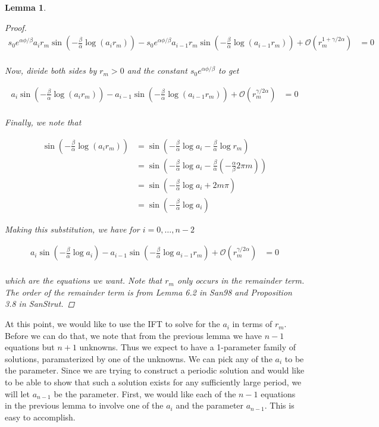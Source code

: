 \documentclass[12pt]{article}
\newtheorem{lemma}{Lemma}
\begin{document}
\begin{lemma}
\begin{proof}
\begin{align}\label{diff2}
s_0 e^{\alpha \phi / \beta } a_i r_m \sin \left( - \frac{\beta}{\alpha} \log (a_i r_m) \right) - s_0 e^{\alpha \phi / \beta } a_{i-1} r_m \sin \left( - \frac{\beta}{\alpha} \log (a_{i-1} r_m) \right) + \mathcal{O}(r_m^{1 + \gamma / 2 \alpha}) &= 0 \\
\end{align}

Now, divide both sides by $r_m > 0$ and the constant $s_0 e^{\alpha \phi / \beta }$ to get

\begin{align}\label{diff2}
a_i \sin \left( - \frac{\beta}{\alpha} \log (a_i r_m) \right) -  a_{i-1} \sin \left( - \frac{\beta}{\alpha} \log (a_{i-1} r_m) \right) + \mathcal{O}(r_m^{\gamma / 2 \alpha}) &= 0 \\
\end{align}

Finally, we note that

\begin{align*}
\sin \left( - \frac{\beta}{\alpha} \log (a_i r_m) \right)&=
\sin \left( - \frac{\beta}{\alpha} \log a_i - \frac{\beta}{\alpha} \log r_m  \right) \\
&= \sin \left( - \frac{\beta}{\alpha} \log a_i -\frac{\beta}{\alpha}\left( -\frac{\alpha}{\beta}2\pi m \right) \right) \\
&= \sin \left( - \frac{\beta}{\alpha} \log a_i + 2 m \pi \right) \\
&= \sin \left( - \frac{\beta}{\alpha} \log a_i \right) 
\end{align*}

Making this substitution, we have for $i = 0, \dots, n-2$

\begin{align}\label{diff3}
a_i \sin \left( - \frac{\beta}{\alpha} \log a_i \right) - a_{i-1} \sin \left( - \frac{\beta}{\alpha} \log a_{i-1} r_m \right) + \mathcal{O}(r_m^{\gamma / 2 \alpha}) &= 0 \\
\end{align}

which are the equations we want. Note that $r_m$ only occurs in the remainder term. The order of the remainder term is from Lemma 6.2 in San98 and Proposition 3.8 in SanStrut.

\end{proof}
\end{lemma}

At this point, we would like to use the IFT to solve for the $a_i$ in terms of $r_m$. Before we can do that, we note that from the previous lemma we have $n-1$ equations but $n+1$ unknowns. Thus we expect to have a 1-parameter family of solutions, paramaterized by one of the unknowns. We can pick any of the $a_i$ to be the parameter. Since we are trying to construct a periodic solution and would like to be able to show that such a solution exists for any sufficiently large period, we will let $a_{n-1}$ be the parameter. First, we would like each of the $n-1$ equations in the previous lemma to involve one of the $a_i$ and the parameter $a_{n-1}$. This is easy to accomplish.
\end{document}
